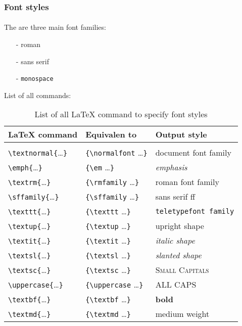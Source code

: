 \documentclass[11pt,a4paper]{article}
\begin{document}
\subsubsection{Font styles}
\paragraph{}
The are three main font families:
\begin{itemize}
	\itemsep1pt \parskip0pt 
	\item[-] \textrm{roman}
	\item[-] \textsf{sans serif}
	\item[-] \texttt{monospace}
\end{itemize}
List of all commands:
\begin{table}[htbp]
	\centering
	\begin{tabular}{ p{3.5cm}  | p{3.5cm} | p{4cm} }
		\toprule
		\textbf{\LaTeX{} command} & \textbf{Equivalen to} & \textbf{Output style} \\
		\midrule \\
		\verb|\textnormal{|\ldots\verb|}| & \verb|{\normalfont| \ldots\verb|}| & document font family \\ \hline \noalign{\smallskip}
		\verb|\emph{|\ldots\verb|}| & \verb|{\em| \ldots\verb|}| & \emph{emphasis} \\ \hline \noalign{\smallskip}
		\verb|\textrm{|\ldots\verb|}| & \verb|{\rmfamily| \ldots\verb|}| & \textrm{roman font family} \\ \hline \noalign{\smallskip}
		\verb|\sffamily{|\ldots\verb|}| & \verb|{\sffamily| \ldots\verb|}| & \textsf{sans serif ff} \\ \hline \noalign{\smallskip}
		\verb|\texttt{|\ldots\verb|}| & \verb|{\texttt| \ldots\verb|}| & \texttt{teletypefont family} \\ \hline \noalign{\smallskip}
		\verb|\textup{|\ldots\verb|}| & \verb|{\textup| \ldots\verb|}| & \textup{upright shape} \\ \hline \noalign{\smallskip}
		\verb|\textit{|\ldots\verb|}| & \verb|{\textit| \ldots\verb|}| & \textit{italic shape} \\ \hline \noalign{\smallskip}
		\verb|\textsl{|\ldots\verb|}| & \verb|{\textsl| \ldots\verb|}| & \textsl{slanted shape} \\ \hline \noalign{\smallskip}
		\verb|\textsc{|\ldots\verb|}| & \verb|{\textsc| \ldots\verb|}| & \textsc{Small Capitals} \\ \hline \noalign{\smallskip}
		\verb|\uppercase{|\ldots\verb|}| & \verb|{\uppercase| \ldots\verb|}| & \uppercase{all caps} \\ \hline \noalign{\smallskip}
		\verb|\textbf{|\ldots\verb|}| & \verb|{\textbf| \ldots\verb|}| & \textbf{bold} \\ \hline \noalign{\smallskip}
		\verb|\textmd{|\ldots\verb|}| & \verb|{\textmd| \ldots\verb|}| & \textmd{medium weight} \\
		\bottomrule
	\end{tabular}
	\caption{List of all \LaTeX{} command to specify font styles}
	\label{fontstyle}
\end{table}
\end{document}
